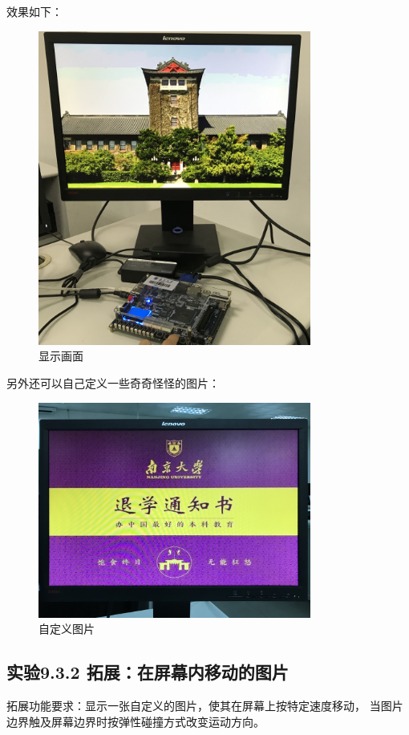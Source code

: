 \documentclass[12pt,a4paper,UTF8]{article}
\begin{document}
效果如下：
\begin{figure}[H]
  \centering
  \includegraphics[width=0.8\textwidth]{img2.JPG}
  \caption{显示画面}
  \label{img2}
\end{figure}

另外还可以自己定义一些奇奇怪怪的图片：
\begin{figure}[H]
  \centering
  \includegraphics[width=0.8\textwidth]{img3.JPG}
  \caption{自定义图片}
  \label{img3}
\end{figure}

\subsection{实验9.3.2 拓展：在屏幕内移动的图片}
拓展功能要求：显示一张自定义的图片，使其在屏幕上按特定速度移动，
当图片边界触及屏幕边界时按弹性碰撞方式改变运动方向。
\end{document}
